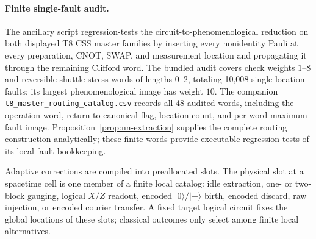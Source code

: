 \documentclass[aps,prx,reprint,superscriptaddress,nofootinbib,floatfix,longbibliography]{revtex4-2}
\theoremstyle{definition}
\begin{document}
\paragraph{Finite single-fault audit.}
The ancillary script regression-tests the circuit-to-phenomenological reduction on both displayed T8 CSS master families by inserting every nonidentity Pauli at every preparation, CNOT, SWAP, and measurement location and propagating it through the remaining Clifford word.  The bundled audit covers check weights $1$--$8$ and reversible shuttle stress words of lengths $0$--$2$, totaling 10,008 single-location faults; its largest phenomenological image has weight $10$.  The companion \texttt{t8\_master\_routing\_catalog.csv} records all 48 audited words, including the operation word, return-to-canonical flag, location count, and per-word maximum fault image.  Proposition~\ref{prop:nn-extraction} supplies the complete routing construction analytically; these finite words provide executable regression tests of its local fault bookkeeping.

Adaptive corrections are compiled into preallocated slots.  The physical
slot at a spacetime cell is one member of a finite local catalog: idle
extraction, one- or two-block gauging, logical $X/Z$ readout, encoded
$|0\rangle/|+\rangle$ birth, encoded discard, raw injection,
or encoded courier transfer.  A fixed target logical circuit fixes the global
locations of these slots; classical outcomes only select among finite local
alternatives.
\end{document}
